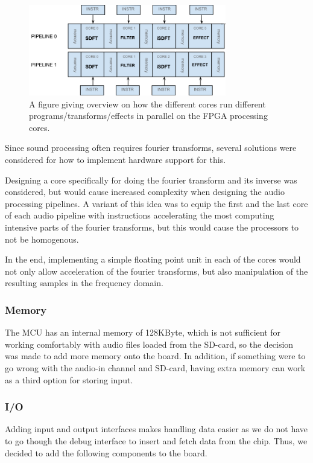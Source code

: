 \begin{figure}[H]
    \centering
    \includegraphics[height=150px]{figures/fpga/system_components_general_pipeline.png}
    \caption{A figure giving overview on how the different cores run
different programs/transforms/effects in parallel on the FPGA processing cores.}
    \label{fig:general_pipeline}
\end{figure}

Since sound processing often requires fourier transforms, several solutions were
considered for how to implement hardware support for this.

Designing a core specifically for doing the fourier transform and its inverse
was considered, but would cause increased complexity when designing the audio
processing pipelines. A variant of this idea was to equip the first and the last
core of each audio pipeline with instructions accelerating the most computing
intensive parts of the fourier transforms, but this would cause the processors
to not be homogenous.

In the end, implementing a simple floating point unit in each of the cores
would not only allow acceleration of the fourier transforms, but also
manipulation of the resulting samples in the frequency domain.

\subsubsection{Memory}
The MCU has an internal memory of 128KByte, which is not sufficient for working
comfortably with audio files loaded from the SD-card, so the decision was made
to add more memory onto the board. In addition, if something were to go wrong
with the audio-in channel and SD-card, having extra memory can work as a third
option for storing input.

\subsubsection{I/O}
Adding input and output interfaces makes handling data easier as we do not have
to go though the debug interface to insert and fetch data from the chip. Thus,
we decided to add the following components to the board.

